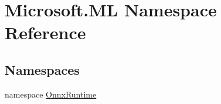 \hypertarget{namespaceMicrosoft_1_1ML}{}\section{Microsoft.\+ML Namespace Reference}
\label{namespaceMicrosoft_1_1ML}
\subsection*{Namespaces}
\begin{DoxyCompactItemize}
\item 
namespace \mbox{\hyperlink{namespaceMicrosoft_1_1ML_1_1OnnxRuntime}{Onnx\+Runtime}}
\end{DoxyCompactItemize}
